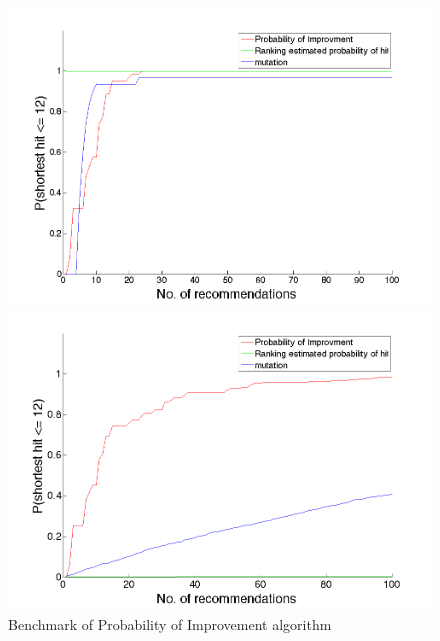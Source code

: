 \documentclass[opre,nonblindrev]{informs3} %
\begin{document}
\begin{figure}[hpt] 
\center
\begin{minipage}{0.48\linewidth}
\includegraphics[width=\textwidth]{pic/PI2.png}
\end{minipage}
\begin{minipage}{0.47\linewidth}
\includegraphics[width=\textwidth]{pic/PI.png}
\end{minipage}
\caption{Benchmark of Probability of Improvement algorithm}
\label{fig:PI}
\end{figure}
\end{document}
